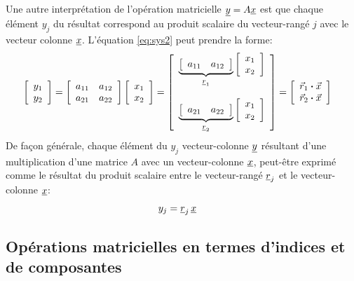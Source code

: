Une autre interprétation de l'opération matricielle $\underline{y} = A \underline{x}$ est que chaque élément $y_j$ du résultat correspond au produit scalaire du vecteur-rangé $j$ avec le vecteur colonne $\underline{x}$. L'équation \eqref{eq:sys2} peut prendre la forme:
%
\begin{align}
\left[ \begin{array}{c} 
	y_1 \\ y_2
\end{array} \right] &= 
\left[ \begin{array}{c c} 
a_{11} & a_{12} \\ a_{21} & a_{22}
\end{array} \right]
\left[ \begin{array}{c} 
	x_1 \\ x_2
\end{array} \right] = 
\left[ \begin{array}{c} 
\underbrace{
\left[ \begin{array}{c c} 
a_{11} & a_{12} 
\end{array} \right]
}_{\underline{r}_1}
\left[ \begin{array}{c} 
	x_1 \\ x_2
\end{array} \right] 
	\\ \\
\underbrace{
\left[ \begin{array}{c c} 
a_{21} & a_{22} 
\end{array} \right]
}_{\underline{r}_2}
\left[ \begin{array}{c} 
	x_1 \\ x_2
\end{array} \right] 
\end{array} \right] 
= 
\left[ \begin{array}{c} 
\vec{r}_1 \boldsymbol{\cdot} \vec{x}
\\
\vec{r}_2 \boldsymbol{\cdot} \vec{x}
\end{array} \right]
\end{align}
%
De façon générale, chaque élément du $y_j$ vecteur-colonne $\underline{y}$ résultant d'une multiplication d'une matrice $A$ avec un vecteur-colonne $\underline{x}$, peut-être exprimé comme le résultat du produit scalaire entre le vecteur-rangé $\underline{r}_j$ et le vecteur-colonne $\underline{x}$:
%
\begin{align}
y_j
&= \underline{r}_j \, \underline{x}
\end{align}
%


\subsection{Opérations matricielles en termes d'indices et de composantes}
\label{sec:opmatind}

